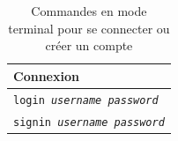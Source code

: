 \documentclass[a4paper,10pt]{article}
\newcommand{\cmd}{\texttt}
\begin{document}

\noindent	
\begin{table}[H]
	\begin{tabular}{|p{5cm}|}
		\hline
		\textbf{Connexion} \\
		\hline \cmd{login  \textit{username} \textit{password}} \\
		\hline \cmd{signin \textit{username} \textit{password}} \\
		\hline
	\end{tabular}
	\centering
	\caption{Commandes en mode terminal pour se connecter ou créer un compte}
\end{table}
\end{document}
